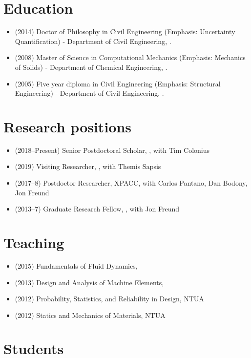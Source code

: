 \section*{Education}

    \begin{itemize}
        \item (2014) Doctor of Philosophy in Civil Engineering (Emphasis: Uncertainty Quantification) - Department of Civil Engineering,  \NTUA.
        \item (2008) Master of Science in Computational Mechanics (Emphasis: Mechanics of Solids) - Department of Chemical Engineering,  \NTUA.
        \item (2005) Five year diploma in Civil Engineering (Emphasis: Structural Engineering) - Department of Civil Engineering,  \NTUA.
    \end{itemize}


\section{Research positions}

\begin{itemize}
    \item (2018--Present) Senior Postdoctoral Scholar, \CIT, with Tim Colonius
    \item (2019) Visiting Researcher, \MIT, with Themis Sapsis
    \item (2017--8) Postdoctor Researcher, XPACC, with Carlos Pantano, Dan Bodony, Jon Freund
    \item (2013--7) Graduate Research Fellow, \UIUC, with Jon Freund

\end{itemize}

\section{Teaching}

\begin{itemize}
    \item (2015) Fundamentals of Fluid Dynamics, \UIUC
    \item (2013) Design and Analysis of Machine Elements, \NTUA
    \item (2012) Probability, Statistics, and Reliability in Design, NTUA
    \item (2012) Statics and Mechanics of Materials, NTUA
\end{itemize}


\section{Students}

